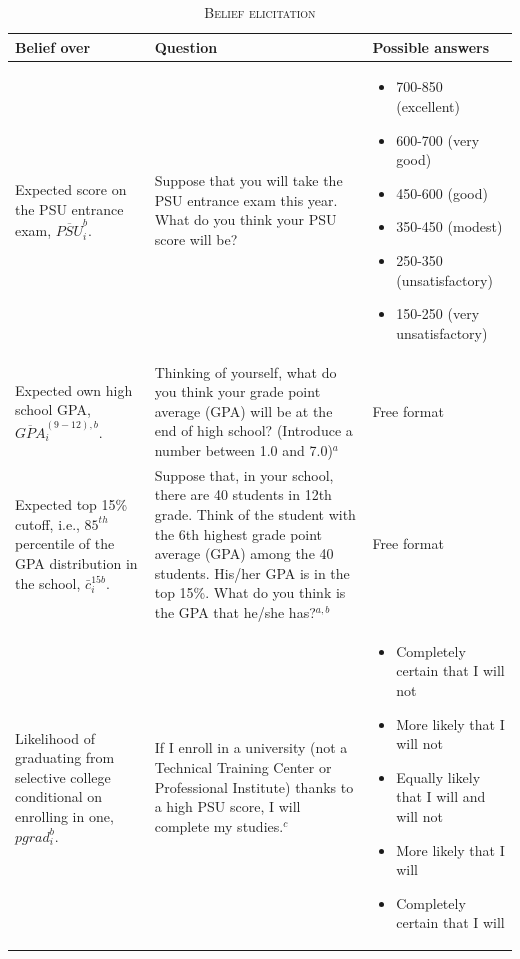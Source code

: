 \begin{table}[H]
    \centering \footnotesize 
    \caption{\label{tab:beliefelicitation} \textsc{Belief elicitation}}
\begin{tabularx}{\linewidth}{ X X X }
 {\bf Belief over}  & {\bf  Question}  & {\bf Possible answers}   \\ \hline
   Expected score on the PSU entrance exam, $\overline{PSU}_i^b$. &  Suppose that you will take the PSU entrance exam this year. What do you think your PSU score will be? & \begin{itemize}
    \setlength\itemsep{-0.5em}
       \item 700-850 (excellent)
       \item 600-700 (very good)
       \item 450-600 (good)
       \item 350-450 (modest)
       \item 250-350 (unsatisfactory)
       \item 150-250 (very unsatisfactory)
   \end{itemize}   \\  \hline
    Expected own high school GPA, $\overline{GPA}_i^{(9-12),b}$. & Thinking of yourself, what do you think your grade point average (GPA) will be at the end of high school? (Introduce a number between 1.0 and 7.0)$^{a}$ & Free format \\ \hline
     Expected top 15\% cutoff, i.e., $85^{th}$ percentile of the GPA distribution in the school, $\bar{c}_i^{15b}$. & 
     Suppose that, in your school, there are 40 students in 12th grade. Think of the student with the 6th highest grade point average (GPA) among the 40 students. His/her GPA is in the top 15\%. What do you think is the GPA that he/she has?$^{a,b}$ & Free format \\ \hline
        Likelihood of graduating from selective college conditional on enrolling in one, $pgrad_i^b$. & If I enroll in a university (not a Technical Training Center or Professional Institute) thanks to a high PSU score, I will complete my studies.$^{c}$ & \begin{itemize} \setlength\itemsep{-0.5em}
            \item Completely certain that I will not
            \item More likely that I will not
            \item Equally likely that I will and will not
            \item More likely that I will
            \item Completely certain that I will
        \end{itemize}\\ \hline 
        

\end{tabularx}
\end{table}
